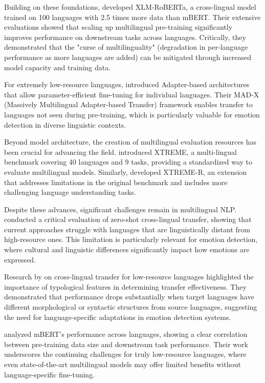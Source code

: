 \documentclass[a4paper,12pt]{extarticle}
\begin{document}
Building on these foundations, \cite{conneau2020unsupervised} developed XLM-RoBERTa, a cross-lingual model trained on 100 languages with 2.5 times more data than mBERT. Their extensive evaluations showed that scaling up multilingual pre-training significantly improves performance on downstream tasks across languages. Critically, they demonstrated that the "curse of multilinguality" (degradation in per-language performance as more languages are added) can be mitigated through increased model capacity and training data.

For extremely low-resource languages, \cite{pfeiffer2020mad} introduced Adapter-based architectures that allow parameter-efficient fine-tuning for individual languages. Their MAD-X (Massively Multilingual Adapter-based Transfer) framework enables transfer to languages not seen during pre-training, which is particularly valuable for emotion detection in diverse linguistic contexts.

Beyond model architecture, the creation of multilingual evaluation resources has been crucial for advancing the field. \cite{hu2020xtreme} introduced XTREME, a multi-lingual benchmark covering 40 languages and 9 tasks, providing a standardized way to evaluate multilingual models. Similarly, \cite{ruder2021xtreme} developed XTREME-R, an extension that addresses limitations in the original benchmark and includes more challenging language understanding tasks.

Despite these advances, significant challenges remain in multilingual NLP. \cite{artetxe2020cross} conducted a critical evaluation of zero-shot cross-lingual transfer, showing that current approaches struggle with languages that are linguistically distant from high-resource ones. This limitation is particularly relevant for emotion detection, where cultural and linguistic differences significantly impact how emotions are expressed.

Research by \cite{ponti2019modeling} on cross-lingual transfer for low-resource languages highlighted the importance of typological features in determining transfer effectiveness. They demonstrated that performance drops substantially when target languages have different morphological or syntactic structures from source languages, suggesting the need for language-specific adaptations in emotion detection systems.

\cite{wu2020all} analyzed mBERT's performance across languages, showing a clear correlation between pre-training data size and downstream task performance. Their work underscores the continuing challenges for truly low-resource languages, where even state-of-the-art multilingual models may offer limited benefits without language-specific fine-tuning.
\end{document}
